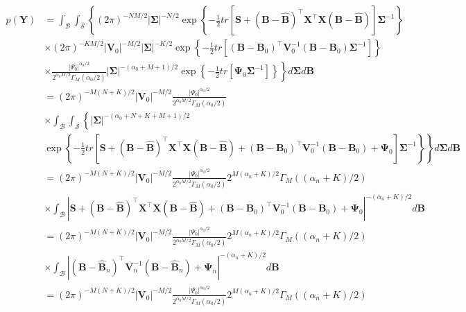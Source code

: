 \begin{align*}
	p({\bm{Y}})&=\int_{\mathcal{B}}\int_{\mathcal{S}}\left\{ (2\pi)^{-NM/2} |{{\bm \Sigma}}|^{-N/2}\exp\left\lbrace -\frac{1}{2}tr\left[{\bm{S}}+({\bm{B}}-\widehat{\bm{B}})^{\top}{\bm{X}}^{\top}{\bm{X}}({\bm{B}}-\widehat{\bm{B}})\right]{{\bm \Sigma}}^{-1}\right\rbrace\right.\\
	&\times (2\pi)^{-KM/2}\left|{\bm V}_0 \right|^{-M/2} \left|{\bm{\Sigma}} \right|^{-K/2}\exp\left\lbrace -\frac{1}{2}tr\left[({\bm{B}}-{\bm{B}}_{0})^{\top}{\bm{V}}_{0}^{-1}({\bm{B}}-{\bm{B}}_{0}){\bm \Sigma}^{-1}\right]\right\rbrace \\
	&\left. \times \frac{|\Psi_0|^{\alpha_0/2}}{2^{\alpha_0M/2}\Gamma_M(\alpha_0/2)} \left|{\bm \Sigma} \right|^{-(\alpha_{0}+M+1)/2}\exp\left\lbrace -\frac{1}{2}tr \left[ {\bm{\Psi}}_{0} {\bm \Sigma}^{-1}\right] \right\rbrace \right\} d{\bm{\Sigma}} d{\bm B}\\
	&=(2\pi)^{-M(N+K)/2}\left|{\bm V}_0\right|^{-M/2}\frac{|\Psi_0|^{\alpha_0/2}}{2^{\alpha_0M/2}\Gamma_M(\alpha_0/2)}\\
	&\times\int_{\mathcal{B}}\int_{\mathcal{S}} \left\{ \left|{\bm \Sigma} \right|^{-(\alpha_{0}+N+K+M+1)/2}\right.\\
	&\left. \exp\left\lbrace -\frac{1}{2}tr\left[{\bm{S}}+({\bm{B}}-\widehat{\bm{B}})^{\top}{\bm{X}}^{\top}{\bm{X}}({\bm{B}}-\widehat{\bm{B}})+({\bm{B}}-{\bm{B}}_{0})^{\top}{\bm{V}}_{0}^{-1}({\bm{B}}-{\bm{B}}_{0})+{\bm{\Psi}}_0\right]{{\bm \Sigma}}^{-1}\right\rbrace\right\}d{\bm{\Sigma}} d{\bm B}\\
	&=(2\pi)^{-M(N+K)/2}\left|{\bm V}_0\right|^{-M/2}\frac{|\Psi_0|^{\alpha_0/2}}{2^{\alpha_0M/2}\Gamma_M(\alpha_0/2)}2^{M(\alpha_n+K)/2}\Gamma_M((\alpha_n+K)/2)\\
	&\times \int_{\mathcal{B}}\left|{\bm{S}}+({\bm{B}}-\widehat{\bm{B}})^{\top}{\bm{X}}^{\top}{\bm{X}}({\bm{B}}-\widehat{\bm{B}})+({\bm{B}}-{\bm{B}}_{0})^{\top}{\bm{V}}_{0}^{-1}({\bm{B}}-{\bm{B}}_{0})+{\bm{\Psi}}_0\right|^{-(\alpha_n+K)/2}d{\bm{B}}\\
	&=(2\pi)^{-M(N+K)/2}\left|{\bm V}_0\right|^{-M/2}\frac{|\Psi_0|^{\alpha_0/2}}{2^{\alpha_0M/2}\Gamma_M(\alpha_0/2)}2^{M(\alpha_n+K)/2}\Gamma_M((\alpha_n+K)/2)\\
	&\times \int_{\mathcal{B}}\left|({\bm{B}}-\widehat{\bm{B}}_n)^{\top}{\bm{V}}_n^{-1}({\bm{B}}-\widehat{\bm{B}}_n)+{\bm{\Psi}}_n\right|^{-(\alpha_n+K)/2}d{\bm{B}}\\ 
	&=(2\pi)^{-M(N+K)/2}\left|{\bm V}_0\right|^{-M/2}\frac{|\Psi_0|^{\alpha_0/2}}{2^{\alpha_0M/2}\Gamma_M(\alpha_0/2)}2^{M(\alpha_n+K)/2}\Gamma_M((\alpha_n+K)/2)\\

\end{align*}

